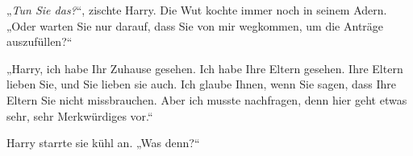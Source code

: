 
„\emph{Tun Sie das?}“, zischte Harry. Die Wut kochte immer noch in seinem Adern. „Oder warten Sie nur darauf, dass Sie von mir wegkommen, um die Anträge auszufüllen?“

„Harry, ich habe Ihr Zuhause gesehen. Ich habe Ihre Eltern gesehen. Ihre Eltern lieben Sie, und Sie lieben sie auch. Ich glaube Ihnen, wenn Sie sagen, dass Ihre Eltern Sie nicht missbrauchen. Aber ich musste nachfragen, denn hier geht etwas sehr, sehr Merkwürdiges vor.“

Harry starrte sie kühl an. „Was denn?“


